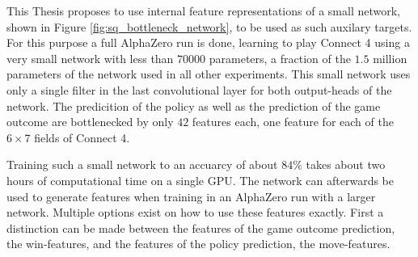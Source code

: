 \documentclass[12pt,onecolumn,oneside,titlepage]{article}
\begin{document}
This Thesis proposes to use internal feature representations of a small network, shown in Figure \ref{fig:sq_bottleneck_network}, to be used as such auxilary targets. For this purpose a full AlphaZero run is done, learning to play Connect 4 using a very small network with less than $70000$ 
parameters, a fraction of the $1.5$ million parameters of the network used in all other experiments. This small network uses only a single filter in the last convolutional layer for both output-heads of the network. The predicition of the policy as well as the prediction of the game outcome 
are bottlenecked by only $42$ features each, one feature for each of the $6 \times 7$ fields of Connect 4.

Training such a small network to an accuarcy of about $84\%$ takes about two hours of computational time on a single GPU. The network can afterwards be used to generate features when training in an AlphaZero run with a larger network.
Multiple options exist on how to use these features exactly. First a distinction can be made between the features of the game outcome prediction, the win-features, and the features of the policy prediction, the move-features.
\end{document}
